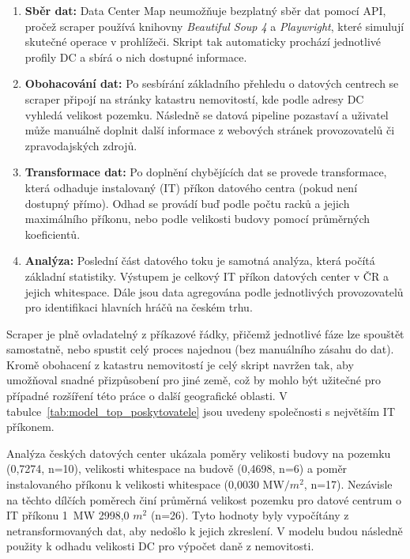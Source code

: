 \begin{enumerate}

\item \textbf{Sběr dat:} Data Center Map neumožňuje bezplatný sběr dat pomocí API, pročež scraper používá knihovny \textit{Beautiful Soup 4} a \textit{Playwright}, které simulují skutečné operace v prohlížeči. Skript tak automaticky prochází jednotlivé profily DC a sbírá o nich dostupné informace.

\item \textbf{Obohacování dat:} Po sesbírání základního přehledu o datových centrech se scraper připojí na stránky katastru nemovitostí, kde podle adresy DC vyhledá velikost pozemku. Následně se datová pipeline pozastaví a uživatel může manuálně doplnit další informace z webových stránek provozovatelů či zpravodajských zdrojů.

\item \textbf{Transformace dat:} Po doplnění chybějících dat se provede transformace, která odhaduje instalovaný (IT) příkon datového centra (pokud není dostupný přímo). Odhad se provádí buď podle počtu racků a jejich maximálního příkonu, nebo podle velikosti budovy pomocí průměrných koeficientů.

\item \textbf{Analýza:} Poslední část datového toku je samotná analýza, která počítá základní statistiky. Výstupem je celkový IT příkon datových center v ČR a jejich whitespace. Dále jsou data agregována podle jednotlivých provozovatelů pro identifikaci hlavních hráčů na českém trhu.

\end{enumerate}

Scraper je plně ovladatelný z příkazové řádky, přičemž jednotlivé fáze lze spouštět samostatně, nebo spustit celý proces najednou (bez manuálního zásahu do dat). Kromě obohacení z katastru nemovitostí je celý skript navržen tak, aby umožňoval snadné přizpůsobení pro jiné země, což by mohlo být užitečné pro případné rozšíření této práce o další geografické oblasti. V tabulce~\ref{tab:model_top_poskytovatele} jsou uvedeny společnosti s největším IT příkonem.

Analýza českých datových center ukázala poměry velikosti budovy na pozemku (0,7274, n=10), velikosti whitespace na budově (0,4698, n=6) a poměr instalovaného příkonu k velikosti whitespace (0,0030 $\text{MW} / m^2$, n=17). Nezávisle na těchto dílčích poměrech činí průměrná velikost pozemku pro datové centrum o IT příkonu 1~MW 2998,0 $m^2$ (n=26). Tyto hodnoty byly vypočítány z netransformovaných dat, aby nedošlo k jejich zkreslení. V modelu budou následně použity k odhadu velikosti DC pro výpočet daně z nemovitosti.

